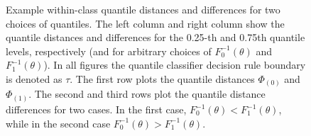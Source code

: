 \begin{figure}[p]
  \caption[cccc]{Example within-class quantile distances and differences for two
    choices of quantiles.  The left column and right column show the quantile
    distances and differences for the 0.25-th and 0.75th quantile levels,
    respectively (and for arbitrary choices of $F_0^{-1}(\theta)$ and
    $F_1^{-1}(\theta)$).  In all figures the quantile classifier decision rule
    boundary is denoted as $\tau$.  The first row plots the quantile distances
    $\Phi_{(0)}$ and $\Phi_{(1)}$.  The second and third rows plot the quantile
    distance differences for two cases.  In the first case,
    $F_0^{-1}(\theta) < F_1^{-1}(\theta)$, while in the second case
    $F_0^{-1}(\theta) > F_1^{-1}(\theta)$.}
  \label{fig:phi-lambda}
  \vspace{5mm}
  

\end{figure}
